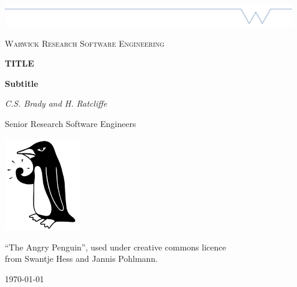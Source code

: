 \begin{titlepage}
	\centering
	\includegraphics[width=0.95\textwidth]{Warwick_A4_Bar}\par\vspace{1cm}
	{\scshape\LARGE Warwick Research Software Engineering \par}
	\vspace{1cm}
	{\huge\bfseries TITLE\par}
	{\large\bfseries Subtitle \par}
	\vspace{2cm}
	{\Large\itshape C.S. Brady and H. Ratcliffe\par}
	Senior Research Software Engineers\par
	\vspace{3cm}
	\includegraphics[width=0.25\textwidth]{WarwickRSE}\par\vspace{1cm}
	{\scriptsize ``The Angry Penguin'', used under creative commons licence\\
from Swantje Hess and Jannis Pohlmann.}

	\vfill

	{\large \today\par}
\end{titlepage}